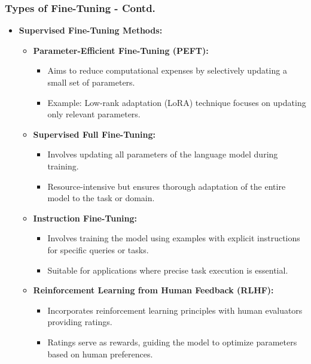 \begin{frame}[fragile]\frametitle{Types of Fine-Tuning - Contd.}
  \begin{itemize}
    \item \textbf{Supervised Fine-Tuning Methods:}
      \begin{itemize}
        \item \textbf{Parameter-Efficient Fine-Tuning (PEFT):}
          \begin{itemize}
            \item Aims to reduce computational expenses by selectively updating a small set of parameters.
            \item Example: Low-rank adaptation (LoRA) technique focuses on updating only relevant parameters.
          \end{itemize}
        \item \textbf{Supervised Full Fine-Tuning:}
          \begin{itemize}
            \item Involves updating all parameters of the language model during training.
            \item Resource-intensive but ensures thorough adaptation of the entire model to the task or domain.
          \end{itemize}
        \item \textbf{Instruction Fine-Tuning:}
          \begin{itemize}
            \item Involves training the model using examples with explicit instructions for specific queries or tasks.
            \item Suitable for applications where precise task execution is essential.
          \end{itemize}
        \item \textbf{Reinforcement Learning from Human Feedback (RLHF):}
          \begin{itemize}
            \item Incorporates reinforcement learning principles with human evaluators providing ratings.
            \item Ratings serve as rewards, guiding the model to optimize parameters based on human preferences.
          \end{itemize}
      \end{itemize}
  \end{itemize}
\end{frame}

